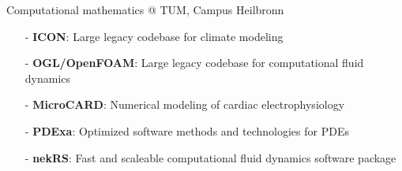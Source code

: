 \documentclass[t,usepdftitle=false]{beamer}
\begin{document}
\begin{frame}{Computational mathematics @ TUM, Campus Heilbronn}
\begin{itemize}
\begin{itemize}
\item[-] \textbf{ICON}: Large legacy codebase for climate modeling\vspace{.05cm}
\item[-] \textbf{OGL/OpenFOAM}: Large legacy codebase for computational fluid dynamics\vspace{.05cm}
\item[-] \textbf{MicroCARD}: Numerical modeling of cardiac electrophysiology\vspace{.05cm}
\item[-] \textbf{PDExa}: Optimized software methods and technologies for PDEs\vspace{.05cm}
\item[-] \textbf{nekRS}: Fast and scaleable computational fluid dynamics software package
\end{itemize}
\end{itemize}
\end{frame}
\end{document}
